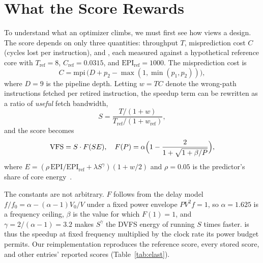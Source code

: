 \documentclass[conference]{IEEEtran}
\newcommand{\vfs}{\text{VFS}}
\newcommand{\epi}{\text{EPI}}
\begin{document}
\section{What the Score Rewards}

To understand what an optimizer climbs, we must first see how \vfs{} views a
design. The score depends on only three quantities: throughput $T$,
misprediction cost $C$ (cycles lost per instruction), and \epi{}, each measured
against a hypothetical reference core with $T_\text{ref}=8$,
$C_\text{ref}=0.0315$, and $\epi{}_\text{ref}=1000$. The misprediction cost is
\begin{equation}
C = \text{mpi}\,\bigl(D + p_2 - \max(1,\min(p_1,p_2))\bigr),
\label{eq:cpi}
\end{equation}
where $D=9$ is the pipeline depth. Letting $w=TC$ denote the wrong-path
instructions fetched per retired instruction, the speedup term can be rewritten
as a ratio of \emph{useful} fetch bandwidth,
\begin{equation}
S = \frac{T/(1+w)}{T_\text{ref}/(1+w_\text{ref})},
\label{eq:speedup}
\end{equation}
and the score becomes
\begin{equation}
\vfs{} = S\cdot F(SE),\quad
F(P)=\alpha\Bigl(1-\frac{2}{1+\sqrt{1+\beta/P}}\Bigr),
\label{eq:vfs}
\end{equation}
where $E=(\rho\,\epi{}/\epi{}_\text{ref}+\lambda S^{\gamma})(1+w/2)$ and
$\rho=0.05$ is the predictor's share of core energy~\cite{vfsmetric}.

The constants are not arbitrary. $F$ follows from the delay model
$f/f_0=\alpha-(\alpha-1)V_0/V$ under a fixed power envelope $PV^2f=1$, so
$\alpha=1.625$ is a frequency ceiling, $\beta$ is the value for which $F(1)=1$,
and $\gamma=2/(\alpha-1)=3.2$ makes $S^\gamma$ the DVFS energy of running $S$
times faster. \vfs{} is thus the speedup at fixed frequency multiplied by the
clock rate its power budget permits. Our reimplementation reproduces the
reference score, every stored score, and other entries' reported scores
(Table~\ref{tab:elast}).
\end{document}
